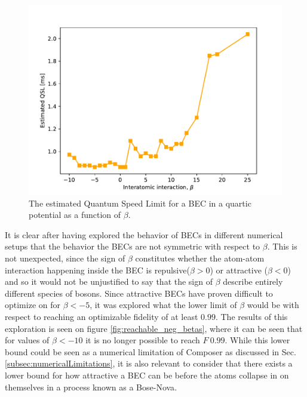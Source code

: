 \documentclass[a4paper, twocolumn]{revtex4-1}
\begin{document}
\begin{figure}[h]
	\includegraphics[width=\columnwidth]{graphics/exploration/QSL.pdf}
	\caption{The estimated Quantum Speed Limit for a BEC in a quartic potential as a function of $\beta$.}
	\label{fig:QSL}
\end{figure}

It is clear after having explored the behavior of BECs in different numerical setups that the behavior the BECs are not symmetric with respect to $\beta$. This is not unexpected, since the sign of $\beta$ constitutes whether the atom-atom interaction happening inside the BEC is repulsive($\beta>0$) or attractive ($\beta<0$) and so it would not be unjustified to say that the sign of $\beta$ describe entirely different species of bosons. Since attractive BECs have proven difficult to optimize on for $\beta<-5$, it was explored what the lower limit of $\beta$ would be with respect to reaching an optimizable fidelity of at least $0.99$. The results of this exploration is seen on figure \ref{fig:reachable_neg_betas}, where it can be seen that for values of $\beta<-10$ it is no longer possible to reach $F~0.99$. While this lower bound could be seen as a numerical limitation of Composer as discussed in Sec. \ref{subsec:numericalLimitations}, it is also relevant to consider that there exists a lower bound for how attractive a BEC can be before the atoms collapse in on themselves in a process known as a Bose-Nova\cite{Donley2001}.
\end{document}
